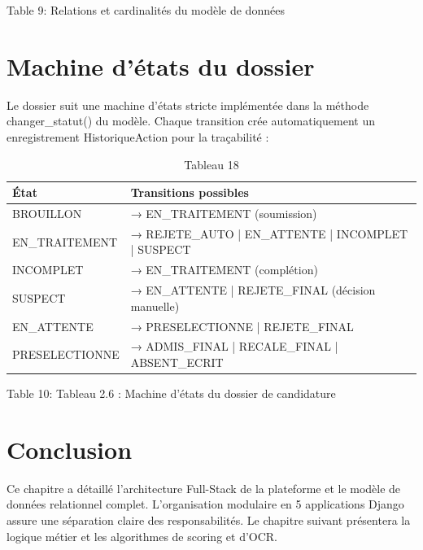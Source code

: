 Table 9: Relations et cardinalités du modèle de données

\section{Machine d'états du dossier}

Le dossier suit une machine d'états stricte implémentée dans la méthode changer\_statut() du modèle. Chaque transition crée automatiquement un enregistrement HistoriqueAction pour la traçabilité :

\begin{table}[htbp]
\centering
\begin{tabular}{|l|l|}
\hline
État & Transitions possibles \\
\hline
BROUILLON & → EN\_TRAITEMENT (soumission) \\
\hline
EN\_TRAITEMENT & → REJETE\_AUTO | EN\_ATTENTE | INCOMPLET | SUSPECT \\
\hline
INCOMPLET & → EN\_TRAITEMENT (complétion) \\
\hline
SUSPECT & → EN\_ATTENTE | REJETE\_FINAL (décision manuelle) \\
\hline
EN\_ATTENTE & → PRESELECTIONNE | REJETE\_FINAL \\
\hline
PRESELECTIONNE & → ADMIS\_FINAL | RECALE\_FINAL | ABSENT\_ECRIT \\
\hline
\end{tabular}
\caption{Tableau 18}
\label{tab:table_18}
\end{table}

Table 10: Tableau 2.6 : Machine d'états du dossier de candidature

\section{Conclusion}

Ce chapitre a détaillé l'architecture Full-Stack de la plateforme et le modèle de données relationnel complet. L'organisation modulaire en 5 applications Django assure une séparation claire des responsabilités. Le chapitre suivant présentera la logique métier et les algorithmes de scoring et d'OCR.

